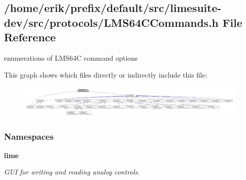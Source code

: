 \subsection{/home/erik/prefix/default/src/limesuite-\/dev/src/protocols/\+L\+M\+S64\+C\+Commands.h File Reference}
\label{LMS64CCommands_8h}


enumerations of L\+M\+S64C command options  


This graph shows which files directly or indirectly include this file\+:
\nopagebreak
\begin{figure}[H]
\begin{center}
\leavevmode
\includegraphics[width=350pt]{de/d80/LMS64CCommands_8h__dep__incl}
\end{center}
\end{figure}
\subsubsection*{Namespaces}
\begin{DoxyCompactItemize}
\item 
 {\bf lime}
\begin{DoxyCompactList}\small\item\em G\+UI for writing and reading analog controls. \end{DoxyCompactList}\end{DoxyCompactItemize}
